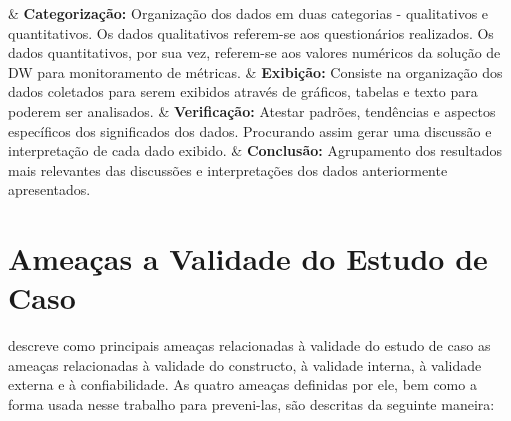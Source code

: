 \begin{easylist}[itemize]	
	
	& \textbf{Categorização: } Organização dos dados em duas categorias - qualitativos e quantitativos. Os 		dados qualitativos referem-se aos questionários realizados. Os dados quantitativos, por sua vez, 			referem-se aos valores numéricos da solução de DW para monitoramento de métricas. 
	& \textbf{Exibição: } Consiste na organização dos dados coletados para serem exibidos através de 				gráficos, tabelas e texto para poderem ser analisados. 
	& \textbf{Verificação: } Atestar padrões, tendências e aspectos específicos dos significados dos 				dados. Procurando assim gerar uma discussão e interpretação de cada dado exibido.
	& \textbf{Conclusão: } Agrupamento dos resultados mais relevantes das discussões e interpretações dos 			dados anteriormente apresentados.
	
	\end{easylist}

\section{Ameaças a Validade do Estudo de Caso} \label{sec:Validade}

 descreve como principais ameaças relacionadas à validade do estudo de caso as ameaças relacionadas à validade do constructo, à validade interna, à validade externa e à confiabilidade. As quatro ameaças definidas por ele, bem como a forma usada nesse trabalho para preveni-las, são descritas da seguinte maneira: 

